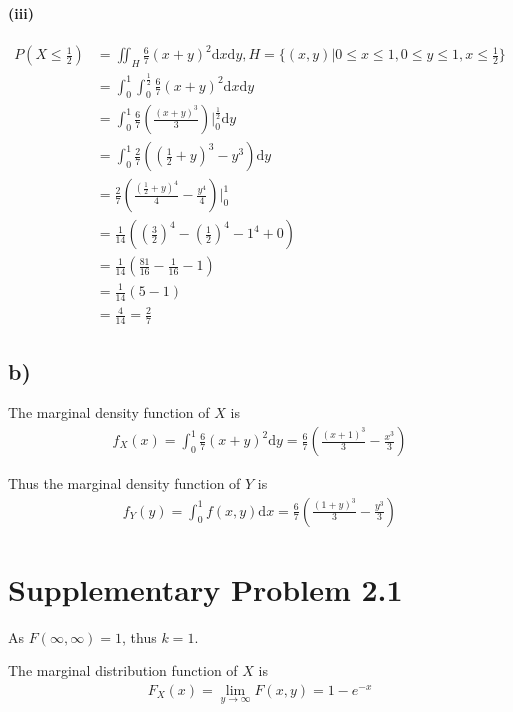 \documentclass[a4paper, UTF-8]{article}
\theoremstyle{plain}
\begin{document}
\paragraph{(iii)} 
\begin{align*}
P(X \leq \frac{1}{2}) &= \iint_{H} \frac{6}{7}(x + y)^2 \mathrm{d}x \mathrm{d}y, H = \{(x, y) | 0 \leq x \leq 1, 0 \leq y \leq 1, x \leq \frac{1}{2}\}\\
&= \int_{0}^1 \int_{0}^{\frac{1}{2}} \frac{6}{7}(x + y)^2 \mathrm{d}x \mathrm{d}y\\
&= \int_{0}^1 \frac{6}{7} \left( \frac{(x+y)^3}{3} \right) \Big|_{0}^{\frac{1}{2}} \mathrm{d}y\\
&= \int_{0}^1 \frac{2}{7} \left( \left(\frac{1}{2}+y\right)^3 - y^3 \right) \mathrm{d}y\\
&= \frac{2}{7} \left( \frac{\left(\frac{1}{2}+y\right)^4}{4} - \frac{y^4}{4} \right) \Big|_{0}^1\\
&= \frac{1}{14} \left( \left(\frac{3}{2}\right)^4 - \left(\frac{1}{2}\right)^4 - 1^4 + 0 \right)\\
&= \frac{1}{14} \left( \frac{81}{16} - \frac{1}{16} - 1 \right)\\
&= \frac{1}{14} \left( 5 - 1 \right)\\
&= \frac{4}{14} = \frac{2}{7}
\end{align*}

\subsection{b)} 

The marginal density function of $X$ is
\begin{align*}
f_X(x) = \int_0^1 \frac{6}{7}(x + y)^2 \mathrm{d}y = \frac{6}{7} \left(\frac{(x + 1)^3}{3} - \frac{x^3}{3}\right)
\end{align*}

Thus the marginal density function of $Y$ is
\begin{align*}
f_Y(y) = \int_0^1 f(x, y) \mathrm{d}x = \frac{6}{7} \left(\frac{(1 + y)^3}{3} - \frac{y^3}{3}\right)
\end{align*}

\section{Supplementary Problem 2.1}

As $F(\infty, \infty) = 1$, thus $k = 1$.

The marginal distribution function of $X$ is
\begin{align*}
F_X(x) = \lim_{y \to \infty} F(x, y) = 1 - e^{- x}
\end{align*}
\end{document}
